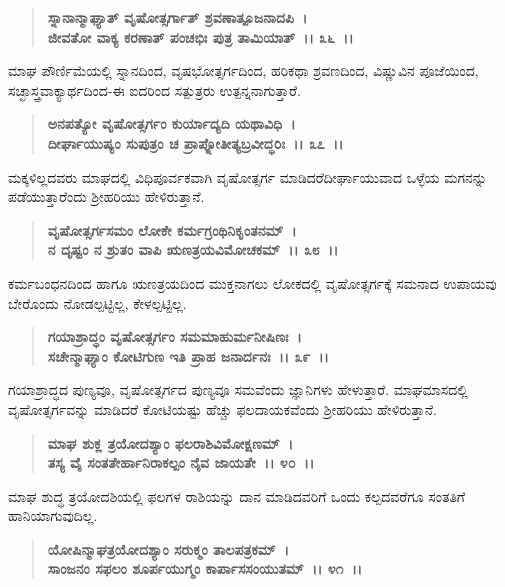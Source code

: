 \begin{verse}
\textbf{ಸ್ನಾನಾನ್ಮಾಘ್ಯಾತ್ ವೃಷೋತ್ಸರ್ಗಾತ್ ಶ್ರವಣಾತ್ಪೂಜನಾದಪಿ~।}\\\textbf{ಜೀವತೋ ವಾಕ್ಯ ಕರಣಾತ್ ಪಂಚಭಿಃ ಪುತ್ರ ತಾಮಿಯಾತ್~।। ೩೬~।।}
\end{verse}

ಮಾಘ ಪೌರ್ಣಿಮೆಯಲ್ಲಿ ಸ್ನಾನದಿಂದ, ವೃಷಭೋತ್ಸರ್ಗದಿಂದ, ಹರಿಕಥಾ ಶ್ರವಣದಿಂದ, ವಿಷ್ಣುವಿನ ಪೂಜೆಯಿಂದ, ಸಚ್ಛಾಸ್ತ್ರವಾಕ್ಯಾರ್ಥದಿಂದ-ಈ ಐದರಿಂದ ಸತ್ಪುತ್ರರು ಉತ್ಪನ್ನ\-ನಾಗುತ್ತಾರೆ.

\begin{verse}
\textbf{ಅನಪತ್ಯೋ ವೃಷೋತ್ಸರ್ಗಂ ಕುರ್ಯಾದ್ಯದಿ ಯಥಾವಿಧಿ~।}\\\textbf{ದೀರ್ಘಾಯುಷ್ಯಂ ಸುಪುತ್ರಂ ಚ ಪ್ರಾಪ್ನೋತೀತ್ಯಬ್ರವೀದ್ಧರಿಃ~।। ೩೭~।।}
\end{verse}

ಮಕ್ಕಳಿಲ್ಲದವರು ಮಾಘದಲ್ಲಿ ವಿಧಿಪೂರ್ವಕವಾಗಿ ವೃಷೋತ್ಸರ್ಗ ಮಾಡಿದರೆ\break ದೀರ್ಘಾಯುವಾದ ಒಳ್ಳೆಯ ಮಗನನ್ನು ಪಡೆಯುತ್ತಾರೆಂದು ಶ‍್ರೀಹರಿಯು ಹೇಳಿರುತ್ತಾನೆ.

\begin{verse}
\textbf{ವೃಷೋತ್ಸರ್ಗಸಮಂ ಲೋಕೇ ಕರ್ಮಗ್ರಂಥಿನಿಕೃಂತನಮ್~।}\\\textbf{ನ ದೃಷ್ಟಂ ನ ಶ್ರುತಂ ವಾಪಿ ಋಣತ್ರಯವಿಮೋಚಕಮ್~।। ೩೮~।।}
\end{verse}

ಕರ್ಮಬಂಧನದಿಂದ ಹಾಗೂ ಋಣತ್ರಯದಿಂದ ಮುಕ್ತನಾಗಲು ಲೋಕದಲ್ಲಿ ವೃಷೋ\-ತ್ಸರ್ಗಕ್ಕೆ ಸಮನಾದ ಉಪಾಯವು ಬೇರೊಂದು ನೋಡಲ್ಪಟ್ಟಿಲ್ಲ, ಕೇಳಲ್ಪಟ್ಟಿಲ್ಲ.

\begin{verse}
\textbf{ಗಯಾಶ್ರಾದ್ಧಂ ವೃಷೋತ್ಸರ್ಗಂ ಸಮಮಾಹುರ್ಮನೀಷಿಣಃ~।}\\\textbf{ಸಚೇನ್ಮಾಘ್ಯಾಂ ಕೋಟಿಗುಣ ಇತಿ ಪ್ರಾಹ ಜನಾರ್ದನಃ~।। ೩೯~।।}
\end{verse}

ಗಯಾಶ್ರಾದ್ಧದ ಪುಣ್ಯವೂ, ವೃಷೋತ್ಸರ್ಗದ ಪುಣ್ಯವೂ ಸಮವೆಂದು ಜ್ಞಾನಿಗಳು ಹೇಳು\-ತ್ತಾರೆ. ಮಾಘಮಾಸದಲ್ಲಿ ವೃಷೋತ್ಸರ್ಗವನ್ನು ಮಾಡಿದರೆ ಕೋಟಿಯಷ್ಟು ಹೆಚ್ಚು ಫಲದಾಯಕವೆಂದು ಶ‍್ರೀಹರಿಯು ಹೇಳಿರುತ್ತಾನೆ.

\begin{verse}
\textbf{ಮಾಘ ಶುಕ್ಲ ತ್ರಯೋದಶ್ಯಾಂ ಫಲರಾಶಿವಿಮೋಕ್ಷಣಮ್~।}\\\textbf{ತಸ್ಯ ವೈ ಸಂತತೇರ್ಹಾನಿರಾಕಲ್ಪಂ ನೈವ ಜಾಯತೇ~।। ೪೦~।। }
\end{verse}

ಮಾಘ ಶುದ್ಧ ತ್ರಯೋದಶಿಯಲ್ಲಿ ಫಲಗಳ ರಾಶಿಯನ್ನು ದಾನ ಮಾಡಿದವರಿಗೆ ಒಂದು ಕಲ್ಪದವರೆಗೂ ಸಂತತಿಗೆ ಹಾನಿಯಾಗುವುದಿಲ್ಲ.

\begin{verse}
\textbf{ಯೋಷಿನ್ಮಾಘತ್ರಯೋದಶ್ಯಾಂ ಸರುಕ್ಮಂ ತಾಲಪತ್ರಕಮ್~।}\\\textbf{ಸಾಂಜನಂ ಸಫಲಂ ಶೂರ್ಪಯುಗ್ಮಂ ಕಾರ್ಪಾಸಸಂಯುತಮ್~।। ೪೧~।। }
\end{verse}

